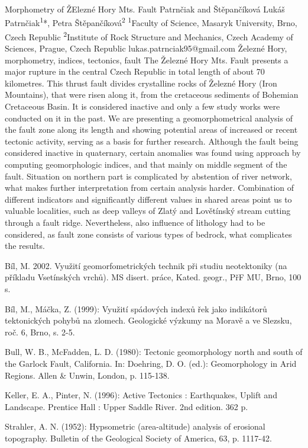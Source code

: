 \abstract
{Morphometry of ŽElezné Hory Mts. Fault} 
{Patrnčiak and Štěpančíková} 
{Lukáš Patrnčiak\textsuperscript{1}*, Petra Štěpančíková\textsuperscript{2}} 
{\POtag} 
{
	\textsuperscript{1}Faculty of Science, Masaryk University, Brno, Czech Republic
	\textsuperscript{2}Institute of Rock Structure and Mechanics, Czech Academy of Sciences, Prague, Czech Republic
}
{lukas.patrnciak95@gmail.com}  %
{Železné Hory, morphometry, indices, tectonics, fault}
{
The Železné Hory Mts. Fault presents a major rupture in the central Czech Republic in total length of about 70 kilometres. This thrust fault divides crystalline rocks of Železné Hory (Iron Mountains), that were risen along it, from the cretaceous sediments of Bohemian Cretaceous Basin. It is considered inactive and only a few study works were conducted on it in the past. We are presenting a geomorphometrical analysis of the fault zone along its length and showing potential areas of increased or recent tectonic activity, serving as a basis for further research. Although the fault being considered inactive in quaternary, certain anomalies was found using approach by computing geomorphologic indices, and that mainly on middle segment of the fault. Situation on northern part is complicated by abstention of river network, what makes further interpretation from certain analysis harder. Combination of different indicators and significantly different values in shared areas point us to valuable localities, such as deep valleys of Zlatý and Lovětínský stream cutting through a fault ridge. Nevertheless, also influence of lithology had to be considered, as fault zone consists of various types of bedrock, what complicates the results.
}
{
Bíl, M. 2002. Využití geomorfometrických technik při studiu neotektoniky (na příkladu Vsetínských vrchů). MS disert. práce, Kated. geogr., PřF MU, Brno, 100 s. 

Bíl, M., Máčka, Z. (1999): Využití spádových indexů řek jako indikátorů tektonických pohybů na zlomech. Geologické výzkumy na Moravě a ve Slezsku, roč. 6, Brno, s. 2-5.

Bull, W. B., McFadden, L. D. (1980): Tectonic geomorphology north and south of the Garlock Fault, California. In: Doehring, D. O. (ed.): Geomorphology in Arid Regions. Allen \& Unwin, London, p. 115-138.

Keller, E. A., Pinter, N. (1996): Active Tectonics : Earthquakes, Uplift and Landscape. Prentice Hall : Upper Saddle River. 2nd edition. 362 p.

Strahler, A. N. (1952): Hypsometric (area-altitude) analysis of erosional topography. Bulletin of the Geological Society of America, 63, p. 1117-42.
}

